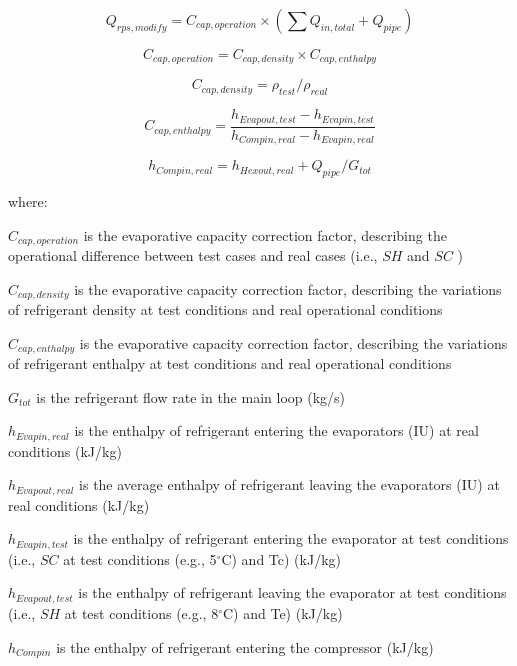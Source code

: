 \begin{equation}
Q_{rps,modify} = C_{cap,operation}\times(\sum{Q_{in,total}}+Q_{pipe})
\end{equation}

\begin{equation}
C_{cap,operation} = C_{cap,density}\times{C_{cap,enthalpy}}
\end{equation}

\begin{equation}
C_{cap,density} = \rho_{test}/\rho_{real}
\end{equation}

\begin{equation}
C_{cap,enthalpy} = \frac{h_{Evapout,test}-h_{Evapin,test}}{h_{Compin,real}-h_{Evapin,real}}
\end{equation}

\begin{equation}
h_{Compin,real} = h_{Hexout,real}+Q_{pipe}/G_{tot}
\end{equation}

where:

\(C_{cap,operation}\) is the evaporative capacity correction factor, describing the operational difference between test cases and real cases (i.e., \(SH\) and \(SC\) )

\(C_{cap,density}\) is the evaporative capacity correction factor, describing the variations of refrigerant density at test conditions and real operational conditions

\(C_{cap,enthalpy}\) is the evaporative capacity correction factor, describing the variations of refrigerant enthalpy at test conditions and real operational conditions

\(G_{tot}\) is the refrigerant flow rate in the main loop (kg/s)

\(h_{Evapin,real}\) is the enthalpy of refrigerant entering the evaporators (IU) at real conditions (kJ/kg)

\(h_{Evapout,real}\) is the average enthalpy of refrigerant leaving the evaporators (IU) at real conditions (kJ/kg)

\(h_{Evapin,test}\) is the enthalpy of refrigerant entering the evaporator at test conditions (i.e., \(SC\) at test conditions (e.g., 5\(^{\circ}\)C) and Tc) (kJ/kg)

\(h_{Evapout,test}\) is the enthalpy of refrigerant leaving the evaporator at test conditions (i.e., \(SH\) at test conditions (e.g., 8\(^{\circ}\)C) and Te) (kJ/kg)

\(h_{Compin}\) is the enthalpy of refrigerant entering the compressor (kJ/kg)

